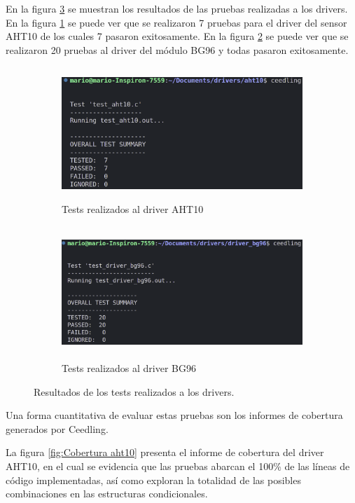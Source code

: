En la figura \ref{fig:Resultado de tests drivers} se muestran los resultados de las pruebas realizadas a los drivers. En la figura \ref{fig:test driver AHT10} se puede ver que se realizaron 7 pruebas para el driver del sensor AHT10 de los cuales 7 pasaron exitosamente. En la figura \ref{fig:Test driver BG96} se puede ver que se realizaron 20 pruebas al driver del módulo BG96 y todas pasaron exitosamente.
\begin{figure}[h!]
    \begin{subfigure}[b]{0.49\linewidth}
      \includegraphics[width=\textwidth, height=5cm]{./Figures/resultado_test_aht10.png}
      \caption{Tests realizados al driver AHT10}
      \label{fig:test driver AHT10}
    \end{subfigure}
\hfill
  \begin{subfigure}[b]{0.49\linewidth}
    \includegraphics[width=\textwidth, height=5cm]{./Figures/resultado_test_bg96.png}
      \caption{Tests realizados al driver BG96}
      \label{fig:Test driver BG96}
  \end{subfigure}
      \caption{Resultados de los tests realizados a los drivers.}
    \label{fig:Resultado de tests drivers}
\end{figure}

Una forma cuantitativa de evaluar estas pruebas son los informes de cobertura generados por Ceedling.

La figura \ref{fig:Cobertura aht10} presenta el informe de cobertura del driver AHT10, en el cual se evidencia que las pruebas abarcan el 100\% de las líneas de código implementadas, así como exploran la totalidad de las posibles combinaciones en las estructuras condicionales.

